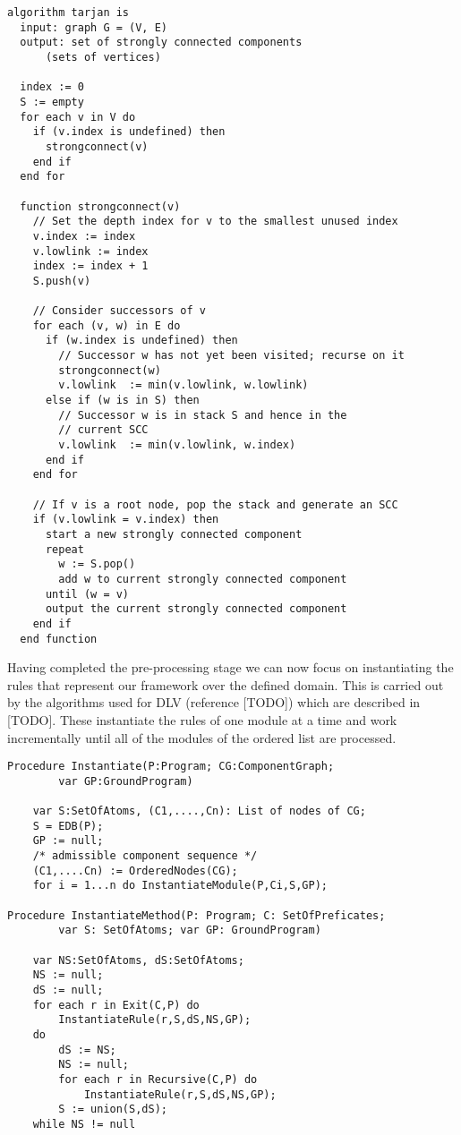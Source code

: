 \begin{Verbatim}[frame=single]
algorithm tarjan is
  input: graph G = (V, E)
  output: set of strongly connected components
      (sets of vertices)

  index := 0
  S := empty
  for each v in V do
    if (v.index is undefined) then
      strongconnect(v)
    end if
  end for

  function strongconnect(v)
    // Set the depth index for v to the smallest unused index
    v.index := index
    v.lowlink := index
    index := index + 1
    S.push(v)

    // Consider successors of v
    for each (v, w) in E do
      if (w.index is undefined) then
        // Successor w has not yet been visited; recurse on it
        strongconnect(w)
        v.lowlink  := min(v.lowlink, w.lowlink)
      else if (w is in S) then
        // Successor w is in stack S and hence in the 
        // current SCC
        v.lowlink  := min(v.lowlink, w.index)
      end if
    end for

    // If v is a root node, pop the stack and generate an SCC
    if (v.lowlink = v.index) then
      start a new strongly connected component
      repeat
        w := S.pop()
        add w to current strongly connected component
      until (w = v)
      output the current strongly connected component
    end if
  end function
\end{Verbatim}

Having completed the pre-processing stage we can now focus on instantiating the rules that represent our framework over the defined domain. This is carried out by the algorithms used for DLV (reference [TODO]) which are described in [TODO]. These instantiate the rules of one module at a time and work incrementally until all of the modules of the ordered list are processed. 

\begin{Verbatim}[frame=single]
Procedure Instantiate(P:Program; CG:ComponentGraph; 
		var GP:GroundProgram)
		
	var S:SetOfAtoms, (C1,....,Cn): List of nodes of CG;
	S = EDB(P);
	GP := null;
	/* admissible component sequence */	
	(C1,....Cn) := OrderedNodes(CG);
	for i = 1...n do InstantiateModule(P,Ci,S,GP);
	
Procedure InstantiateMethod(P: Program; C: SetOfPreficates;
		var S: SetOfAtoms; var GP: GroundProgram)
		
	var NS:SetOfAtoms, dS:SetOfAtoms;
	NS := null;
	dS := null;
	for each r in Exit(C,P) do 
		InstantiateRule(r,S,dS,NS,GP);
	do
		dS := NS;
		NS := null;
		for each r in Recursive(C,P) do 
			InstantiateRule(r,S,dS,NS,GP);
		S := union(S,dS);
	while NS != null	
\end{Verbatim}

